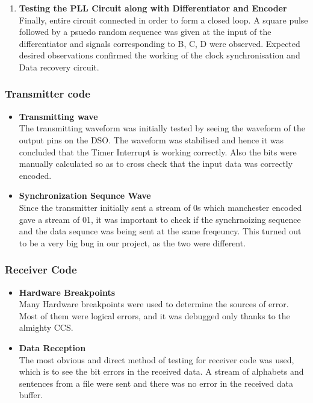 \documentclass{article}
\begin{document}
\begin{enumerate}[label=(\alph*)]
\item \textbf{Testing the PLL Circuit along with Differentiator and  Encoder} \\ Finally, entire circuit connected in order to form a closed loop. A square pulse followed by a psuedo random sequence was given at the input of the differentiator and signals corresponding to B, C, D were observed. Expected desired observations confirmed the working of the clock synchronisation and Data recovery circuit.
\end{enumerate}

\subsubsection{Transmitter code}
\begin{itemize}
\item \textbf{Transmitting wave}\\
  The transmitting waveform was initially tested by seeing the waveform of the output pins on the DSO. The waveform was stabilised and hence it was concluded that the Timer Interrupt is working correctly. Also the bits were manually calculated so as to cross check that the input data was correctly encoded. 
\item \textbf{Synchronization Sequnce Wave}\\
  Since the transmitter initially sent a stream of 0s which manchester encoded gave a stream of 01, it was important to check if the synchrnoizing sequence and the data sequnce was being sent at the same freqeuncy. This turned out to be a very big bug in our project, as the two were different.
\end{itemize}

\subsubsection{Receiver Code}
\begin{itemize}
\item \textbf{Hardware Breakpoints}\\
  Many Hardware breakpoints were used to determine the sources of error. Most of them were logical errors, and it was debugged only thanks to the almighty CCS.
\item \textbf{Data Reception}\\
  The most obvious and direct method of testing for receiver code was used, which is to see the bit errors in the received data. A stream of alphabets and sentences from a file were sent and there was no error in the received data buffer.
\end{itemize}
%  
\end{document}

